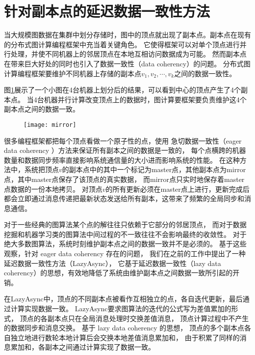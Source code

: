 \section{针对副本点的延迟数据一致性方法}

当大规模图数据在集群中划分存储时，图中的顶点就出现了副本点。副本点在现有的分布式图计算编程框架中充当着关键角色。
它使得框架可以对单个顶点进行并行处理，并使不同机器上的邻居顶点在本地互相访问数据成为可能。
然而副本点在带来巨大好处的同时也引入了数据一致性（data coherency）的问题。\cite{Wang@PPoPP18, zlj2018}
分布式图计算编程框架要维护不同机器上存储的副本点$v_1, v_2, \cdots, v_k$之间的数据一致性。

图\ref{fig:mirror}展示了一个小图在4台机器上划分后的结果，可以看到中心的顶点产生了4个副本点。
当4台机器并行计算改变顶点上的数据时，图计算要框架要负责维护这4个副本点之间的数据一致。

\begin{figure}[!htbp]
  \centering
  \texttt{[image: mirror]}
  \label{fig:mirror}
\end{figure}


很多编程框架都把每个顶点看做一个原子性的点，使用 急切数据一致性（eager data coherency ）方法来保证所有副本之间的数据是一致的，
每个点横跨的机器数量和数据同步频率直接影响系统通信量的大小进而影响系统的性能。
在这种方法中，系统把顶点$v$的副本点中的其中一个标记为master点，其他副本点为mirror点，其中master点保存了该顶点的真实数据，
而mirror点只实时地保存着master点数据的一份本地拷贝。
对顶点$v$的所有更新必须在master点上进行，更新完成后都会立即通过消息传递把最新状态发送给所有副本，这带来了频繁的全局同步和消息通信。

对于一些经典的图算法某个点的解往往只依赖于它部分的邻居顶点，
而对于数据挖掘和机器学习类的图算法中间过程的不一致往往不会影响最终的收敛性。
对于绝大多数图算法，系统时刻维护副本点之间的数据一致并不是必须的。
基于这些观察，针对 eager data coherency 存在的问题，
我们在之前的工作\cite{Wang@PPoPP18}中提出了一种延迟数据一致性方法（LazyAsync）\cite{zlj2018}，
它基于延迟数据一致性（lazy data coherency）的思想，有效地降低了系统由维护副本点之间数据一致所引起的开销。

在LazyAsync中，顶点的不同副本点被看作互相独立的点，各自迭代更新，最后通过计算实现数据一致。
LazyAsync要求图算法的迭代的公式写为差值累加的形式，
顶点的各副本点只在全局消息处理时交换差值消息，
顶点计算过程中不产生的数据同步和消息交换。
基于 lazy data coherency 的思想，
顶点的多个副本点各自独立地进行数轮本地计算后会交换本地差值消息累加和，
由于积累了同样的消息累加和，各副本之间通过计算实现了数据一致。

